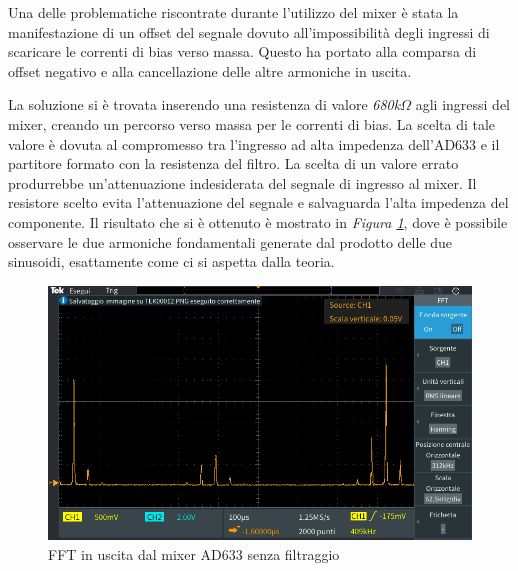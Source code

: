 \documentclass[titlepage]{report}
\begin{document}
	Una delle problematiche riscontrate durante l'utilizzo del mixer è stata la manifestazione di un offset del segnale dovuto all'impossibilità degli ingressi di scaricare le correnti di bias verso massa. Questo ha portato alla comparsa di offset negativo e alla cancellazione delle altre armoniche in uscita.

	La soluzione si è trovata inserendo una resistenza di valore \textit{680k$\Omega$} agli ingressi del mixer, creando un percorso verso massa per le correnti di bias. La scelta di tale valore è dovuta al compromesso tra l'ingresso ad alta impedenza dell'AD633 e il partitore formato con la resistenza del filtro. La scelta di un valore errato produrrebbe un'attenuazione indesiderata del segnale di ingresso al mixer. Il resistore scelto evita l'attenuazione del segnale e salvaguarda l'alta impedenza del componente. Il risultato che si è ottenuto è mostrato in \textit{Figura \ref{fig:FFTAD633}}, dove è possibile osservare le due armoniche fondamentali generate dal prodotto delle due sinusoidi, esattamente come ci si aspetta dalla teoria.

	\begin{figure}[H]
		\centering
		\includegraphics[scale = 0.5]{Immagini/ad633_fft_mixed.PNG}
		\caption{FFT in uscita dal mixer AD633 senza filtraggio}
		\label{fig:FFTAD633}
	\end{figure}



	\label{ch:Risultati}
	
\newpage
\end{document}
